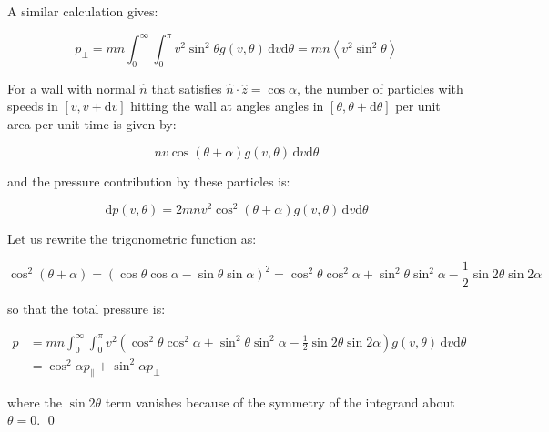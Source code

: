 \documentclass[12pt]{article}
\begin{document}
A similar calculation gives:

\begin{equation}
    p_{\perp} = mn \int_{0}^{\infty} \int_{0}^{\pi} v^{2} \sin^{2}{\theta} g(v, \theta) \, \mathrm{d}v \mathrm{d}\theta = mn \left\langle v^{2} \sin^{2}{\theta} \right\rangle
\end{equation}

For a wall with normal $\hat{n}$ that satisfies $\hat{n} \cdot \hat{z} = \cos{\alpha}$, the number of particles with speeds in $[v, v + \mathrm{d}v]$ hitting the wall at angles angles in $[\theta, \theta + \mathrm{d}\theta]$ per unit area per unit time is given by:

\begin{equation}
    nv \cos{(\theta + \alpha)} g(v, \theta) \, \mathrm{d}v \mathrm{d}\theta
\end{equation}

and the pressure contribution by these particles is:

\begin{equation}
    \mathrm{d}p(v, \theta) = 2mnv^{2} \cos^{2}{(\theta + \alpha)} g(v, \theta) \, \mathrm{d}v \mathrm{d}\theta
\end{equation}

Let us rewrite the trigonometric function as:

\begin{equation}
    \cos^{2}{(\theta + \alpha)} = \left( \cos{\theta} \cos{\alpha} - \sin{\theta} \sin{\alpha} \right)^{2} = \cos^{2}{\theta} \cos^{2}{\alpha} + \sin^{2}{\theta} \sin^{2}{\alpha} - \frac{1}{2} \sin{2\theta} \sin{2\alpha}
\end{equation}

so that the total pressure is:

\begin{equation}
    \begin{split}
        p &= mn \int_{0}^{\infty} \int_{0}^{\pi} v^{2} \left( \cos^{2}{\theta} \cos^{2}{\alpha} + \sin^{2}{\theta} \sin^{2}{\alpha} - \frac{1}{2} \sin{2\theta} \sin{2\alpha} \right) g(v, \theta) \, \mathrm{d}v \mathrm{d}\theta \\
        &= \cos^{2}\alpha p_{\parallel} + \sin^{2}\alpha p_{\perp}
    \end{split}
\end{equation}

where the $\sin{2\theta}$ term vanishes because of the symmetry of the integrand about $\theta = 0$.
\qed


\pagebreak
\end{document}

